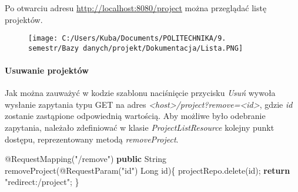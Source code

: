 \documentclass[]{article}
\newenvironment{Shaded}{}{}
\newcommand{\AttributeTok}[1]{\textcolor[rgb]{0.49,0.56,0.16}{#1}}
\newcommand{\BuiltInTok}[1]{#1}
\newcommand{\FunctionTok}[1]{\textcolor[rgb]{0.02,0.16,0.49}{#1}}
\newcommand{\KeywordTok}[1]{\textcolor[rgb]{0.00,0.44,0.13}{\textbf{#1}}}
\newcommand{\NormalTok}[1]{#1}
\newcommand{\OtherTok}[1]{\textcolor[rgb]{0.00,0.44,0.13}{#1}}
\newcommand{\StringTok}[1]{\textcolor[rgb]{0.25,0.44,0.63}{#1}}
\let\oldparagraph\paragraph
\renewcommand{\paragraph}[1]{\oldparagraph{#1}\mbox{}}
\begin{document}
\begin{Shaded}
\end{Shaded}

Po otwarciu adresu \url{http://localhost:8080/project} można przeglądać
listę projektów.

\begin{figure}
\centering
\texttt{[image: C:/Users/Kuba/Documents/POLITECHNIKA/9. semestr/Bazy danych/projekt/Dokumentacja/Lista.PNG]}
\caption{}
\end{figure}

\hypertarget{header-n135}{%
\paragraph{Usuwanie projektów}\label{header-n135}}

Jak można zauważyć w kodzie szablonu naciśnięcie przycisku \emph{Usuń}
wywoła wysłanie zapytania typu GET na adres
\emph{\textless{}host\textgreater{}/project?remove=\textless{}id\textgreater{}},
gdzie \emph{id} zostanie zastąpione odpowiednią wartością. Aby możliwe
było odebranie zapytania, należało zdefiniować w klasie
\emph{ProjectListResource} kolejny punkt dostępu, reprezentowany metodą
\emph{removeProject}.

\begin{Shaded}
\begin{Highlighting}[]
\AttributeTok{@RequestMapping}\NormalTok{(}\StringTok{"/remove"}\NormalTok{)}
\KeywordTok{public} \BuiltInTok{String} \FunctionTok{removeProject}\NormalTok{(}\AttributeTok{@RequestParam}\NormalTok{(}\StringTok{"id"}\NormalTok{) }\BuiltInTok{Long}\NormalTok{ id)\{}
\NormalTok{  projectRepo.}\FunctionTok{delete}\NormalTok{(id);}
  \KeywordTok{return} \StringTok{"redirect:/project"}\NormalTok{;}
\NormalTok{\}}
\end{Highlighting}
\end{Shaded}
\end{document}
